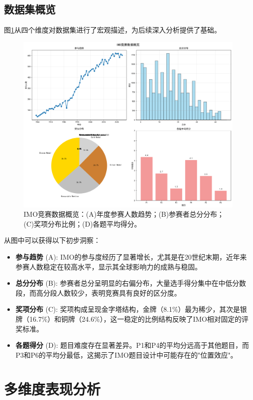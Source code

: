 \documentclass[12pt,a4paper]{article}
\begin{document}
\subsection{数据集概览}
图\ref{fig:data_overview}从四个维度对数据集进行了宏观描述，为后续深入分析提供了基础。

\begin{figure}[H]
    \centering
    \includegraphics[width=\textwidth]{data_overview.png}
    \caption{IMO竞赛数据概览：(A)年度参赛人数趋势；(B)参赛者总分分布；(C)奖项分布比例；(D)各题平均得分。}
    \label{fig:data_overview}
\end{figure}

从图中可以获得以下初步洞察：
\begin{itemize}
    \item \textbf{参与趋势} (A): IMO的参与度经历了显著增长，尤其是在20世纪末期，近年来参赛人数稳定在较高水平，显示其全球影响力的成熟与稳固。
    \item \textbf{总分分布} (B): 参赛者总分呈明显的右偏分布，大量选手得分集中在中低分数段，而高分段人数较少，表明竞赛具有良好的区分度。
    \item \textbf{奖项分布} (C): 奖项构成呈现金字塔结构，金牌（8.1\%）最为稀少，其次是银牌（16.7\%）和铜牌（24.6\%），这一稳定的比例结构反映了IMO相对固定的评奖标准。
    \item \textbf{各题得分} (D): 题目难度存在显著差异。P1和P4的平均分远高于其他题目，而P3和P6的平均分最低，这揭示了IMO题目设计中可能存在的"位置效应"。
\end{itemize}

\section{多维度表现分析}
\end{document}
